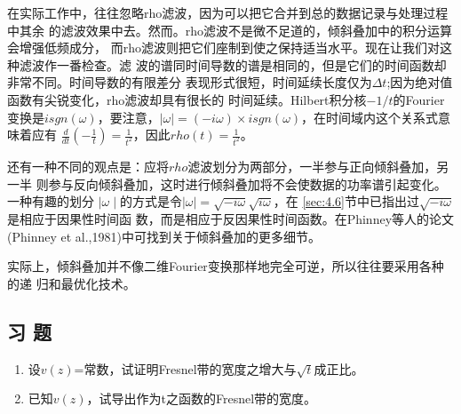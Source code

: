 在实际工作中，往往忽略rho滤波，因为可以把它合并到总的数据记录与处理过程中其余
的滤波效果中去。然而。rho滤波不是微不足道的，倾斜叠加中的积分运算会增强低频成分，
而rho滤波则把它们座制到使之保持适当水平。现在让我们对这种滤波作一番检查。滤
波的谱同时间导数的谱是相同的，但是它们的时间函数却非常不同。时间导数的有限差分
表现形式很短，时间延续长度仅为$\Delta t$;因为绝对值函数有尖锐变化，rho滤波却具有很长的
时间延续。Hilbert积分核$-1/t$的Fourier变换是$isgn(\omega)$，要注意，$\mid
\omega\mid = (-i\omega)\times i sgn(\omega)$，在时间域内这个关系式意味着应有
$\frac{d}{dt}(-\frac{1}{t})=\frac{1}{t^2}$，因此$rho(t)=\frac{1}{t^2}$。

还有一种不同的观点是：应将$rho$滤波划分为两部分，一半参与正向倾斜叠加，另一半
则参与反向倾斜叠加，这时进行倾斜叠加将不会使数据的功率谱引起变化。一种有趣的划分
$\mid \omega\mid$的方式是令$\mid\omega\mid=\sqrt{-i\omega}\sqrt{i\omega}$，在
\ref{sec:4.6}节中已指出过$\sqrt{-i\omega}$是相应于因果性时间函
数，而是相应于反因果性时间函数。在Phinney等人的论文(Phinney et
al.,1981)中可找到关于倾斜叠加的更多细节。

实际上，倾斜叠加并不像二维Fourier变换那样地完全可逆，所以往往要采用各种的递
归和最优化技术。

\subsection{习 题}
\label{sec:5.2.11}

\begin{enumerate}
\item 设$v(z)$=常数，试证明Fresnel带的宽度之增大与$\sqrt{t}$成正比。

\item 已知$v(z)$，试导出作为t之函数的Fresnel带的宽度。
\end{enumerate}









